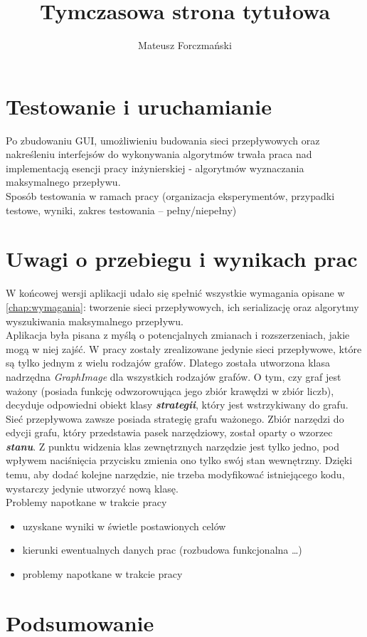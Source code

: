 \documentclass[a4paper]{book}
\title{Tymczasowa strona tytułowa}
\author{Mateusz Forczmański}
\begin{document}



\mainmatter






\chapter{Testowanie i uruchamianie}
Po zbudowaniu GUI, umożliwieniu budowania sieci przepływowych oraz nakreśleniu interfejsów do wykonywania algorytmów trwała praca nad implementacją esencji pracy inżynierskiej - algorytmów wyznaczania maksymalnego przepływu.
\\

Sposób testowania w ramach pracy (organizacja eksperymentów, przypadki testowe, wyniki, zakres testowania -- pełny/niepełny)

\chapter{Uwagi o przebiegu i wynikach prac}
W końcowej wersji aplikacji udało się spełnić wszystkie wymagania opisane w \ref{chap:wymagania}: tworzenie sieci przepływowych, ich serializację oraz algorytmy wyszukiwania maksymalnego przepływu.\\\indent
Aplikacja była pisana z myślą o potencjalnych zmianach i rozszerzeniach, jakie mogą w niej zajść. W pracy zostały zrealizowane jedynie sieci przepływowe, które są tylko jednym z wielu rodzajów grafów. Dlatego została utworzona klasa nadrzędna \emph{GraphImage} dla wszystkich rodzajów grafów. O tym, czy graf jest ważony (posiada funkcję odwzorowująca jego zbiór krawędzi w zbiór liczb), decyduje odpowiedni obiekt klasy \textbf{\textit{strategii}}, który jest wstrzykiwany do grafu. Sieć przepływowa zawsze posiada strategię grafu ważonego. Zbiór narzędzi do edycji grafu, który przedstawia pasek narzędziowy, został oparty o wzorzec \textbf{\textit{stanu}}. Z punktu widzenia klas zewnętrznych narzędzie jest tylko jedno, pod wpływem naciśnięcia przycisku zmienia ono tylko swój stan wewnętrzny. Dzięki temu, aby dodać kolejne narzędzie, nie trzeba modyfikować istniejącego kodu, wystarczy jedynie utworzyć nową klasę.\\\indent
Problemy napotkane w trakcie pracy 

\begin{itemize}
\item uzyskane wyniki w świetle postawionych celów
\item kierunki ewentualnych danych prac (rozbudowa funkcjonalna \ldots)
\item problemy napotkane w trakcie pracy
\end{itemize}	

\chapter{Podsumowanie}


\nocite{*}
\printbibliography

\end{document}
